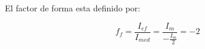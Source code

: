 El factor de forma esta definido por:

\begin{equation}
  f_f = \frac{I_{ef}}{I_{med}} = \frac{I_m}{-\frac{I_{m}}{2}} = -2
\end{equation}


%













